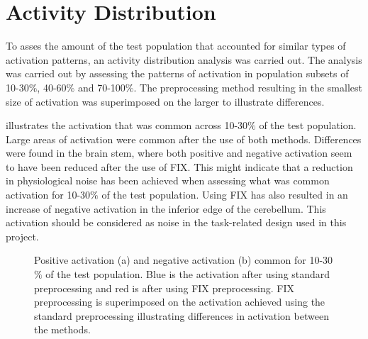 \section{Activity Distribution}

To asses the amount of the test population that accounted for similar types of activation patterns, an activity distribution analysis was carried out. The analysis was carried out by assessing the patterns of activation in population subsets of 10-30$\percent$, 40-60$\percent$ and 70-100$\percent$. The preprocessing method resulting in the smallest size of activation was superimposed on the larger to illustrate differences.  

 illustrates the activation that was common across 10-30$\percent$ of the test population. Large areas of activation were common after the use of both methods. Differences were found in the brain stem, where both positive and negative activation seem to have been reduced after the use of FIX. This might indicate that a reduction in physiological noise has been achieved when assessing what was common activation for 10-30$\percent$ of the test population. Using FIX has also resulted in an increase of negative activation in the inferior edge of the cerebellum. This activation should be considered as noise in the task-related design used in this project.

\begin{figure}[H]%
	\centering
	\qquad
	\caption{Positive activation (a) and negative activation (b) common for 10-30$\percent$ of the test population. Blue is the activation after using standard preprocessing and red is after using FIX preprocessing. FIX preprocessing is superimposed on the activation achieved using the standard preprocessing illustrating differences in activation between the methods.}
	\label{fig:10}
\end{figure}

